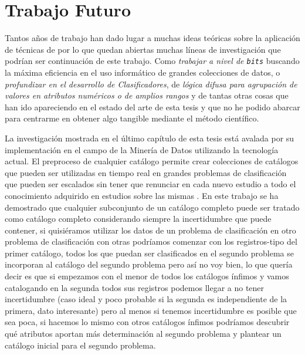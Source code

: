 \section{Trabajo Futuro}
\label{sec:clasificacion:trabajo-futuro}
Tantos años de trabajo han dado lugar a muchas ideas teóricas sobre la aplicación de técnicas de \DM por lo que quedan abiertas muchas líneas de investigación que podrían ser continuación de este trabajo. Como \emph{trabajar a nivel de \texttt{bits}} buscando la máxima eficiencia en el uso informático de grandes colecciones de datos, o \emph{profundizar en el desarrollo de Clasificadores}, de \emph{lógica difusa para agrupación de valores en atributos numéricos o de amplios rangos} y de tantas otras cosas que han ido apareciendo en el estado del arte de esta tesis y que no he podido abarcar para centrarme en obtener algo tangible mediante el método científico.

La investigación mostrada en el último capítulo de esta tesis está avalada por su implementación en el campo de la Minería de Datos utilizando la tecnología actual.
El preproceso de cualquier catálogo permite crear colecciones de catálogos que pueden ser utilizadas en tiempo real en grandes problemas de clasificación que pueden ser escalados sin tener que renunciar en cada nuevo estudio a todo el conocimiento adquirido en estudios sobre las mismas \clases. En este trabajo se ha demostrado que cualquier subconjunto de un catálogo completo puede ser tratado como catálogo completo considerando siempre la incertidumbre que puede contener, si quisiéramos utilizar los datos de un problema de clasificación en otro problema de clasificación con otras \clases podríamos comenzar con los registros-tipo del primer catálogo, todos los que puedan ser clasificados en el segundo problema se incorporan al catálogo del segundo problema pero así no  voy bien, lo que quería decir es que si empezamos con el menor de todos los catálogos ínfimos y vamos catalogando en la segunda \clase todos sus registros podemos llegar a no tener incertidumbre (caso ideal y poco probable si la segunda \clase es independiente de la primera, dato interesante) pero al menos si tenemos incertidumbre es posible que sea poca, si hacemos lo mismo con otros catálogos ínfimos podríamos descubrir qué atributos aportan más determinación al segundo problema y plantear un catálogo inicial para el segundo problema.

